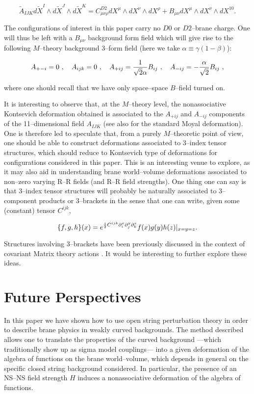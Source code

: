 \documentclass[a4paper,11pt]{article}
\begin{document}
$$
\widetilde{A}_{IJK} d\widetilde{X}^{I} \wedge d\widetilde{X}^{J} 
\wedge d\widetilde{X}^{K} = C^{D2}_{\mu\nu\rho} dX^{\mu} \wedge 
dX^{\nu} \wedge dX^{\rho} + B_{\mu\nu} dX^{\mu} \wedge dX^{\nu} \wedge 
dX^{10}.
$$

The configurations of interest in this paper carry no $D0$ or $D2$--brane
charge. One will thus be left with a $B_{\mu\nu}$ background form field
which will give rise to the following $M$--theory background 3--form field
(here we take $\alpha \equiv \gamma (1-\beta)$):

$$
A_{+-i} = 0\ , \ \ \ A_{ijk} = 0\ , \ \ \ 
A_{+ij} = {1\over\sqrt{2}\alpha} B_{ij}\ , \ \ \ 
A_{-ij} = -{\alpha\over\sqrt{2}} B_{ij}\ , 
$$

\noindent
where one should recall that we have only space--space $B$--field turned on.

It is interesting to observe that, at the $M$--theory level, the
nonassociative Kontsevich deformation obtained is associated to the
$A_{+ij}$ and $A_{-ij}$ components of the 11--dimensional field $A_{IJK}$
(see also \cite{CHL} for the standard Moyal deformation). One is therefore
led to speculate that, from a purely $M$--theoretic point of view, one
should be able to construct deformations associated to 3--index tensor
structures, which should reduce to Kontsevich type of deformations for
configurations considered in this paper. This is an interesting venue to
explore, as it may also aid in understanding brane world--volume
deformations associated to non--zero varying R--R fields (and R--R field
strengths). One thing one can say is that 3--index tensor structures will
probably be naturally associated to 3--component products or 3--brackets in
the sense that one can write, given some (constant) tensor $C^{ijk}$,

$$
\{ f,g,h \} (x) = e^{{i \over 2} C^{ijk} \partial^{x}_{i} \partial^{y}_{j}
\partial^{z}_{k}} f(x) g(y) h (z) |_{x=y=z}.
$$

\noindent
Structures involving 3--brackets have been previously discussed in the
context of covariant Matrix theory actions \cite{Minic}. It would be
interesting to further explore these ideas.


\section{Future Perspectives}


In this paper we have shown how to use open string perturbation theory in
order to describe brane physics in weakly curved backgrounds. The method
described allows one to translate the properties of the curved background
---which traditionally show up as sigma model couplings--- into a given
deformation of the algebra of functions on the brane world--volume, which
depends in general on the specific closed string background considered. In
particular, the presence of an NS--NS field strength $H$ induces a
nonassociative deformation of the algebra of functions.
\end{document}
